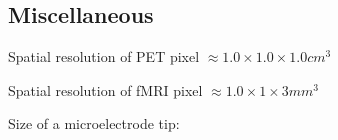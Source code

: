 \subsection*{Miscellaneous}

\be

\item Spatial resolution of PET pixel $\approx 1.0 \times 1.0 \times 1.0 cm^3$

\item Spatial resolution of fMRI pixel $\approx 1.0 \times 1 \times 3  mm^3$

\item Size of a microelectrode tip:

\ee
